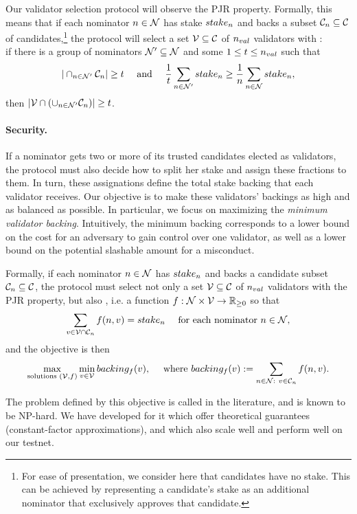 Our validator selection protocol will observe the PJR property.
Formally, this means that if each nominator $n \in \mathcal{N}$ has stake $stake_{n}$ and backs a subset
$\mathcal{C}_{n}\subseteq \mathcal{C}$ of candidates,\footnote{For ease of presentation, we consider here
that candidates have no stake. This can be achieved by representing a candidate's stake
as an additional nominator that exclusively approves that candidate.}
the protocol will select a set $\mathcal{V}\subseteq \mathcal{C}$ of $n_{val}$ validators with : \\
if there is a group of nominators $\mathcal{N}'\subseteq \mathcal{N}$ and some $1\leq t\leq n_{val}$ such that
$$|\cap_{n\in \mathcal{N}'} \mathcal{C}_n| \geq t \quad \text{ and } \quad
\frac{1}{t} \sum_{n\in \mathcal{N}'} stake_{n} \geq \frac{1}{n} \sum_{n\in \mathcal{N}} stake_{n},$$
then $|\mathcal{V}\cap (\cup_{n\in\mathcal{N}'} \mathcal{C}_n)| \geq t$.

\paragraph{Security.} If a nominator gets two or more of its trusted candidates elected as validators,
the protocol must also decide how to split her stake and assign these fractions to them.
In turn, these assignations define the total stake backing that each validator receives.
Our objective is to make these validators' backings as high and as balanced as possible.
In particular, we focus on maximizing the \emph{minimum validator backing}.
Intuitively, the minimum backing corresponds to a lower bound on the cost for an adversary to gain control
over one validator, as well as a lower bound on the potential slashable amount for a misconduct.

Formally, if each nominator $n \in \mathcal{N}$ has $stake_{n}$ and backs a candidate subset $\mathcal{C}_{n}\subseteq \mathcal{C}$,
the protocol must select not only a set $\mathcal{V}\subseteq \mathcal{C}$ of $n_{val}$ validators
with the PJR property, but also ,
i.e. a function $f:\mathcal{N}\times\mathcal{V} \rightarrow \mathbb{R}_{\geq 0}$ so that
$$\sum_{v\in \mathcal{V}\cap \mathcal{C}_{n}} f(n, v) = stake_{n} \quad \text{ for each nominator } n\in\mathcal{N},$$
and the objective is then
$$\max_{\text{solutions } (\mathcal{V}, f)} \min_{v\in \mathcal{V}} backing_f(v),
\quad \text{ where } backing_f(v) := \sum_{n\in \mathcal{N}: \ v\in \mathcal{C}_{n}} f(n, v). $$

The problem defined by this objective is called  in the literature, and is known to be NP-hard.
We have developed for it  which offer theoretical guarantees
(constant-factor approximations), and which also scale well and perform well on our testnet.
